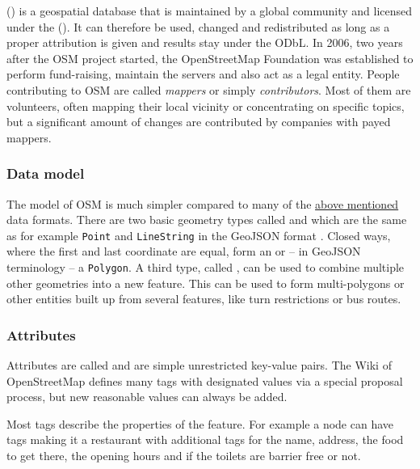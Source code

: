 		 () is a geospatial database that is maintained by a global community and licensed under the  ()\cite{osm-wiki-about}.
		It can therefore be used, changed and redistributed as long as a proper attribution is given and results stay under the ODbL\cite{odbl-summary}.
		In 2006, two years after the OSM project started, the OpenStreetMap Foundation was established to perform fund-raising, maintain the servers and also act as a legal entity.
		People contributing to OSM are called \textit{mappers} or simply \textit{contributors}.
		Most of them are volunteers, often mapping their local vicinity or concentrating on specific topics, but a significant amount of changes are contributed by companies with payed mappers\cite{osm-corporate-mappers}.
		
		\subsubsection{Data model}
		
			The model of OSM is much simpler compared to many of the \hyperref[subsec:file-formats]{above mentioned} data formats.
			There are two basic geometry types called  and  which are the same as for example \texttt{Point} and \texttt{LineString} in the GeoJSON format \cite{osm-wiki-data-model}.
			Closed ways, where the first and last coordinate are equal, form an  or -- in GeoJSON terminology -- a \texttt{Polygon}.
			A third type, called , can be used to combine multiple other geometries into a new feature.
			This can be used to form multi-polygons or other entities built up from several features, like turn restrictions or bus routes.
			
		\subsubsection{Attributes}
		\label{subsubsec:osm-attributes}
			
			Attributes are called  and are simple unrestricted key-value pairs.
			The Wiki of OpenStreetMap defines many tags with designated values via a special proposal process, but new reasonable values can always be added\cite{osm-wiki-proposal-process}.
			
			Most tags describe the properties of the feature.
			For example a node can have tags making it a restaurant with additional tags for the name, address, the food to get there, the opening hours and if the toilets are barrier free or not.
			
